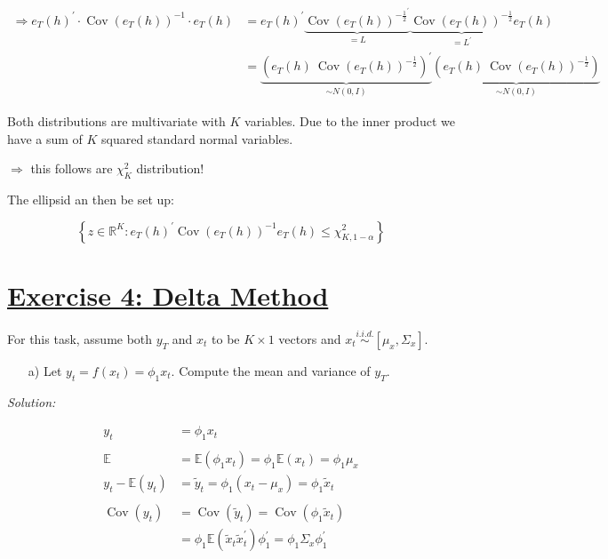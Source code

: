 \documentclass[12pt,a4paper]{article}
\newcommand{\Cov}{\operatorname{Cov}}
\newcommand{\tmpsection}[1]{}
\let\tmpsection=\section
\renewcommand{\section}[1]{\tmpsection{\underline{#1}} }
\begin{document}
\begin{align*}
  \Rightarrow e_T (h)^{'} \cdot \Cov(e_T(h))^{-1} \cdot e_T (h) & = e_T (h)^{'} \underbrace{\Cov(e_T(h))^{- \frac{1}{2}^{'}}}_{= L} \underbrace{\Cov(e_T(h))^{- \frac{1}{2}}}_{= L^{'}} e_T (h)\\
  & = \underbrace{\left( e_T (h) \ \Cov(e_T(h))^{- \frac{1}{2}} \right)^{'}}_{\sim N(0, I)} \underbrace{\left( e_T (h) \ \Cov(e_T(h))^{- \frac{1}{2}} \right)}_{\sim N(0, I)} 
\end{align*}

Both distributions are multivariate with \(K\) variables. Due to the
inner product we have a sum of \(K\) squared standard normal variables.

\(\Rightarrow\) this follows are \(\chi^2_K\) distribution!

The ellipsid an then be set up:

\[\left\{ z \in \mathbb{R}^K: e_T (h)^{'} \Cov(e_T (h))^{-1} e_T (h) \leq \chi_{K, 1- \alpha}^2 \right\}\]

\hypertarget{exercise-4-delta-method}{%
\section{Exercise 4: Delta Method}\label{exercise-4-delta-method}}

For this task, assume both \(y_T\) and \(x_t\) to be \(K \times 1\)
vectors and
\(x_t \overset{i.i.d.}{\sim} \left[ \mu_x, \Sigma_x\right]\).

\begin{itemize}
  \item[a)] Let $y_t = f(x_t) = \phi_1 x_t$. Compute the mean and variance of $y_T$.
\end{itemize}

\emph{Solution:}

\begin{align*}
  y_t & = \phi_1 x_t\\
  \\
  \mathbb{E} & = \mathbb{E} (\phi_1 x_t) = \phi_1 \mathbb{E} (x_t) = \phi_1 \mu_x \\
  y_t - \mathbb{E}(y_t) & = \tilde{y}_t = \phi_1 (x_t - \mu_x) = \phi_1 \tilde{x}_t\\
  \\
  \Cov(y_t) & = \Cov(\tilde{y}_t) = \Cov(\phi_1 \tilde{x}_t) \\
  & = \phi_1 \mathbb{E} (\tilde{x}_t \tilde{x}_t^{'}) \phi_1^{'} = \phi_1 \Sigma_x \phi_1^{'}
\end{align*}
\end{document}
